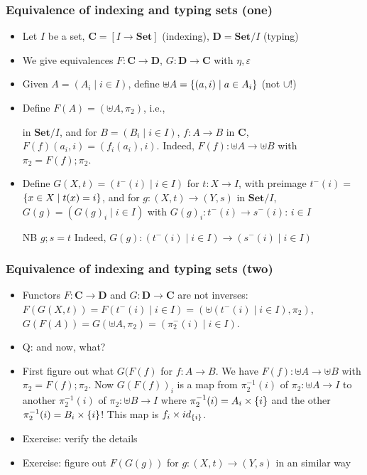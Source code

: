 \documentclass[handout]{beamer}
\newcommand{\bfsf}[1]{{\boldsymbol{#1}}}
\newcommand{\Set}{\bfsf{Set}}
\newcommand{\CC}{\bfsf{C}}
\newcommand{\DD}{\bfsf{D}}
\begin{document}
\frame
  {   
    \frametitle{Equivalence of indexing and typing sets (one)}\label{Ch3:Eq-ind-typ-Set}

 \begin{itemize}[<+->]
\item Let $I$ be a set, $\CC= [I\to\Set]$ (indexing), $\DD= \Set/I$ (typing)
\item We give equivalences $F: \CC\to\DD$, $G: \DD\to\CC$ with $\eta,\varepsilon$
\item Given $A = (A_i \mid i\in I)$, define $\uplus A = \{(a,i) \mid a\in A_i\}$ 
({\color{red}not} $\cup$!)
\item Define  $F(A)= (\uplus A,\pi_2)$, i.e.,
 in $\Set/I$,  %
and for  $B = (B_i \mid i\in I)$, $f  : A\to B$ in $\CC$, $F(f)(a_i,i)=(f_i(a_i),i)$.
Indeed, $F(f): \uplus A \to \uplus B$ with $\pi_2 = F(f);\pi_2$.
\item Define $G(X,t) = (t^-(i) \mid i\in I)$ for $t:X\to I$, 
with preimage $t^-(i)=$ $\{x\in X\mid t(x)=i\}$, and for $g: (X,t)\to(Y,s)$ in $\Set/I$,
$G(g) = (G(g)_i\mid i\in I)$ with $G(g)_i : t^-(i) \to s^-(i)$: %
$i\in I$
 NB $g;s=t$
Indeed, $G(g): (t^-(i) \mid i\in I) \to (s^-(i) \mid i\in I)$
 \end{itemize}

 }

\frame
  {   
    \frametitle{Equivalence of indexing and typing sets (two)}\label{Ch3:Eq-ind-typ-ctnd}

 \begin{itemize}[<+->]
\item Functors  $F :\CC\to\DD$ and $G:\DD\to\CC$ are not inverses:
$F(G(X,t)) = F(t^-(i) \mid i\in I) = (\uplus(t^-(i) \mid i\in I),\pi_2)$,
$G(F(A)) = G (\uplus A,\pi_2) = (\pi_2^-(i) \mid i\in I)$. 
\item Q: and now, what?
\item First figure out what $G(F(f)$ for $f:A\to B$. 
We have $F(f): \uplus A \to \uplus B$ with $\pi_2 = F(f);\pi_2$.
Now $G(F(f))_i$ is a map from $\pi_2^{-1}(i)$ of $\pi_2 : \uplus A \to I$ to
{\color{red} another $\pi_2^{-1}(i)$ of $\pi_2 : \uplus B \to I$}
where $\pi_2^{-1}(i) = A_i \times \{i\}$ and
{\color{red}  the other $\pi_2^{-1}(i)= B_i \times \{i\}$}!
This map is $f_i \times id_{\{i\}}$.
\item Exercise: verify the details
\item Exercise: figure out $F(G(g))$ for $g: (X,t) \to (Y,s)$ in an similar way
 \end{itemize}

 }
\end{document}
